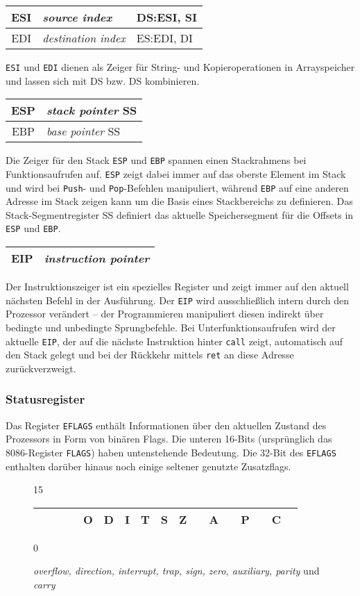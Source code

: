 \begin{tabular}{|c|l|l|}
\hline ESI & \emph{source index} & DS:ESI, SI\\
\hline EDI & \emph{destination index} & ES:EDI, DI\\
\hline
\end{tabular}

{\tt ESI} und {\tt EDI} dienen als Zeiger für String- und Kopieroperationen in Arrayspeicher und lassen sich mit DS bzw. DS kombinieren.

\begin{tabular}{|c|l|}
\hline ESP & \emph{stack pointer} SS\\
\hline EBP & \emph{base pointer} SS\\
\hline
\end{tabular}

Die Zeiger für den Stack {\tt ESP} und {\tt EBP} spannen einen Stackrahmens bei Funktionsaufrufen auf. {\tt ESP} zeigt dabei immer auf das oberste Element im Stack und wird bei {\tt Push}- und {\tt Pop}-Befehlen manipuliert, während {\tt EBP} auf eine anderen Adresse im Stack zeigen kann um die Basis eines Stackbereichs zu definieren. Das Stack-Segmentregister SS definiert das aktuelle Speichersegment für die Offsets in {\tt ESP} und {\tt EBP}.

\begin{tabular}{|c|l|}
\hline EIP & \emph{instruction pointer} \\
\hline
\end{tabular}

Der Instruktionszeiger ist ein spezielles Register und zeigt immer auf den aktuell nächsten Befehl in der Ausführung. Der {\tt EIP} wird ausschließlich intern durch den Prozessor verändert – der Programmieren manipuliert diesen indirekt über bedingte und unbedingte Sprungbefehle. Bei Unterfunktionsaufrufen wird der aktuelle {\tt EIP}, der  auf die nächste Instruktion hinter {\tt call} zeigt, automatisch auf den Stack gelegt und bei der Rückkehr mittels {\tt ret} an diese Adresse zurückverzweigt.

\subsubsection{Statusregister}

Das Register {\tt EFLAGS} enthält Informationen über den aktuellen Zustand des Prozessors in Form von binären Flags. Die unteren 16-Bits (ursprünglich das 8086-Register {\tt FLAGS}) haben untenstehende Bedeutung. Die 32-Bit des {\tt EFLAGS} enthalten darüber hinaus noch einige seltener genutzte Zusatzflags.
\begin{figure}[h]
  \begin{center}
	{\small 15}
	\begin{tabular}{|c|c|c|c|c|c|c|c|c|c|c|c|c|c|c|c|c|}
	\hline & & & & O & D & I & T & S & Z & & A & & P & & C \\
	\hline
	\end{tabular}
	{\small 0}
  \end{center}
  \caption{\emph{overflow, direction, interrupt, trap, sign, zero, auxiliary, parity}
und \emph{carry}}
\end{figure}

